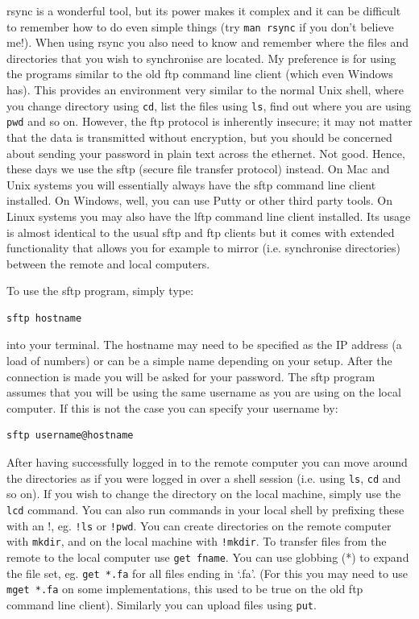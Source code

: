 \documentclass[11pt]{article}
\begin{document}
rsync is a wonderful tool, but its power makes it complex and it can be
difficult to remember how to do even simple things (try \texttt{man rsync} if
you don't believe me!). When using rsync you also need to know and
remember where the files and directories that you wish to synchronise
are located. My preference is for using
the programs similar to the old ftp command line client (which even Windows has). 
This provides an
environment very similar to the normal Unix shell, where you change
directory using \texttt{cd}, list the files using \texttt{ls}, find out where you are
using \texttt{pwd} and so on. However, the ftp protocol is inherently insecure;
it may not matter that the data is transmitted without encryption, but
you should be concerned about sending your password in plain text
across the ethernet. Not good. Hence, these days we use the sftp (secure
file transfer protocol) instead. On Mac and Unix systems you will
essentially always have the sftp command line client installed. On
Windows, well, you can use Putty or other third party tools. On Linux
systems you may also have the lftp command line client installed. Its
usage is almost identical to the usual sftp and ftp clients but it comes
with extended functionality that allows you for example to mirror (i.e.
synchronise directories) between the remote and local computers.

To use the sftp program, simply type:


\begin{verbatim}
sftp hostname
\end{verbatim}

into your terminal. The hostname may need to be specified as the IP
address (a load of numbers) or can be a simple name depending on your
setup. After the connection is made you will be asked for your password.
The sftp program assumes that you will be using the same username as you
are using on the local computer. If this is not the case you can specify
your username by:


\begin{verbatim}
sftp username@hostname
\end{verbatim}

After having successfully logged in to the remote computer you can move
around the directories as if you were logged in over a shell session
(i.e. using \texttt{ls}, \texttt{cd} and so on). If you wish to change the directory
on the local machine, simply use the \texttt{lcd} command. You can also run
commands in your local shell by prefixing these with an !, eg. \texttt{!ls} or
\texttt{!pwd}. You can create directories on the remote computer with \texttt{mkdir},
and on the local machine with \texttt{!mkdir}. To transfer files from the
remote to the local computer use \texttt{get fname}. You can use globbing (*)
to expand the file set, eg. \texttt{get *.fa} for all files ending in `.fa'.
(For this you may need to use \texttt{mget *.fa} on some implementations, this
used to be true on the old ftp command line client). Similarly you can
upload files using \texttt{put}.
\end{document}
